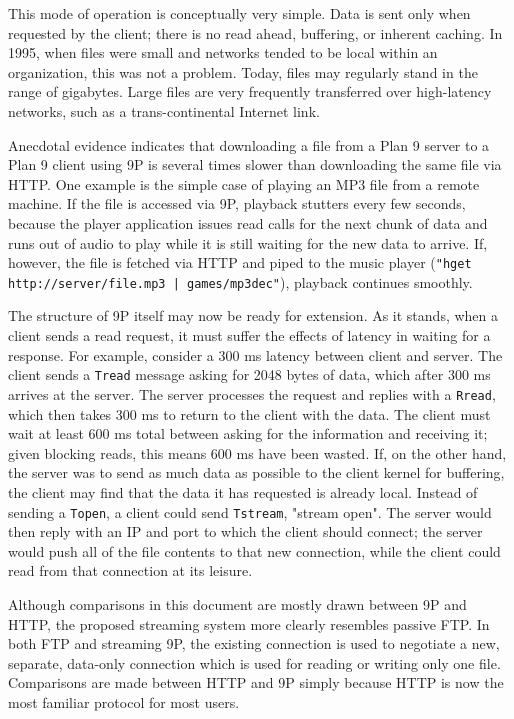 \documentclass[12pt,american]{report}
\begin{document}
This mode of operation is conceptually very simple. Data is sent only when requested by the client; there is no read ahead, buffering, or inherent caching. In 1995, when files were small and networks tended to be local within an organization, this was not a problem. Today, files may regularly stand in the range of gigabytes. Large files are very frequently transferred over high-latency networks, such as a trans-continental Internet link.

Anecdotal evidence indicates that downloading a file from a Plan 9 server to a Plan 9 client using 9P is several times slower than downloading the same file via HTTP. One example is the simple case of playing an MP3 file from a remote machine. If the file is accessed via 9P, playback stutters every few seconds, because the player application issues read calls for the next chunk of data and runs out of audio to play while it is still waiting for the new data to arrive. If, however, the file is fetched via HTTP and piped to the music player ({\tt "hget http://server/file.mp3 | games/mp3dec"}), playback continues smoothly.

The structure of 9P itself may now be ready for extension. As it stands, when a client sends a read request, it must suffer the effects of latency in waiting for a response. For example, consider a 300 ms latency between client and server. The client sends a {\tt Tread} message asking for 2048 bytes of data, which after 300 ms arrives at the server. The server processes the request and replies with a {\tt Rread}, which then takes 300 ms to return to the client with the data. The client must wait at least 600 ms total between asking for the information and receiving it; given blocking reads, this means 600 ms have been wasted. If, on the other hand, the server was to send as much data as possible to the client kernel for buffering, the client may find that the data it has requested is already local. Instead of sending a {\tt Topen}, a client could send {\tt Tstream}, "stream open". The server would then reply with an IP and port to which the client should connect; the server would push all of the file contents to that new connection, while the client could read from that connection at its leisure.

Although comparisons in this document are mostly drawn between 9P and HTTP, the proposed streaming system more clearly resembles passive FTP\cite{FTPrfc}. In both FTP and streaming 9P, the existing connection is used to negotiate a new, separate, data-only connection which is used for reading or writing only one file. Comparisons are made between HTTP and 9P simply because HTTP is now the most familiar protocol for most users.
\end{document}
